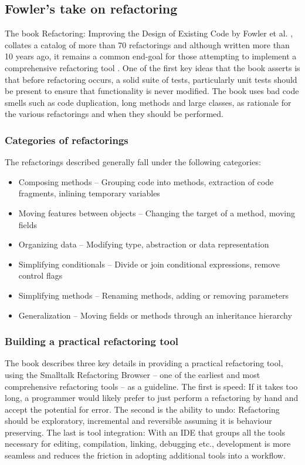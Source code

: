 \subsection{Fowler's take on refactoring}
The book Refactoring: Improving the Design of Existing Code by Fowler et al. \cite{fowler99}, collates a catalog of more than 70 refactorings and although written more than 10 years ago, it remains a common end-goal for those attempting to implement a comprehensive refactoring tool \cite{jetbrains15}. One of the first key ideas that the book asserts is that before refactoring occurs, a solid suite of tests, particularly unit tests should be present to ensure that functionality is never modified. The book uses bad code smells such as code duplication, long methods and large classes, as rationale for the various refactorings and when they should be performed. 

\subsubsection{Categories of refactorings}
The refactorings described generally fall under the following categories:
\begin{itemize}
\item Composing methods -- Grouping code into methods, extraction of code fragments, inlining temporary variables
\item Moving features between objects -- Changing the target of a method, moving fields
\item Organizing data -- Modifying type, abstraction or data representation
\item Simplifying conditionals -- Divide or join conditional expressions, remove control flags
\item Simplifying methods -- Renaming methods, adding or removing parameters
\item Generalization -- Moving fields or methods through an inheritance hierarchy
\end{itemize}

\subsubsection{Building a practical refactoring tool}
The book describes three key details in providing a practical refactoring tool, using the Smalltalk Refactoring Browser -- one of the earliest and most comprehensive refactoring tools -- as a guideline. The first is speed: If it takes too long, a programmer would likely prefer to just perform a refactoring by hand and accept the potential for error. The second is the ability to undo: Refactoring should be exploratory, incremental and reversible assuming it is behaviour preserving. The last is tool integration: With an IDE that groups all the tools necessary for editing, compilation, linking, debugging etc., development is more seamless and reduces the friction in adopting additional tools into a workflow. 

